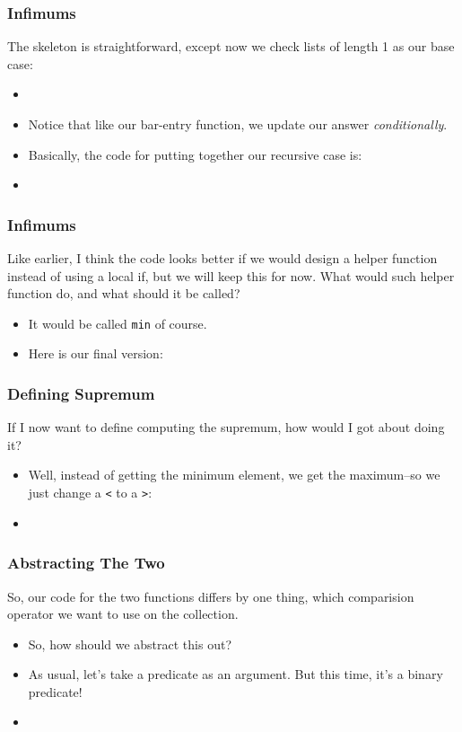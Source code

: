 \documentclass{beamer}
\begin{document}
\begin{frame}
  \frametitle{Infimums}
  The skeleton is straightforward, except now we check lists of length
  1 as our base case:
  \begin{itemize}
  \item<2-> \infSkeleton
  \item<3-> Notice that like our bar-entry function, we update our answer
    \emph{conditionally}.
  \item<4-> Basically, the code for putting together our recursive case is:
  \item<5-> \infCombine
  \end{itemize}
  
\end{frame}

\begin{frame}
  \frametitle{Infimums}
  Like earlier, I think the code looks better if we would design a helper
  function instead of using a local if, but we will keep this for now. What
  would such helper function do, and what should it be called?
  \begin{itemize}
  \item<2-> It would be called \texttt{min} of course.
  \item<3-> Here is our final version:
    \inf
  \end{itemize}
\end{frame}

\begin{frame}
  \frametitle{Defining Supremum}
  If I now want to define computing the supremum, how would I got about
  doing it?
  \begin{itemize}
  \item<2-> Well, instead of getting the minimum element, we get the maximum--so
    we just change a \texttt{<} to a \texttt{>}:
  \item<3-> \sup
  \end{itemize}
\end{frame}

\begin{frame}
  \frametitle{Abstracting The Two}
  So, our code for the two functions differs by one thing, which comparision
  operator we want to use on the collection.
\begin{itemize}
\item<2-> So, how should we abstract this out?
\item<3-> As usual, let's take a predicate as an argument. But this time, it's
  a binary predicate!
\item<4-> \extremum
\end{itemize}
\end{frame}
\end{document}
